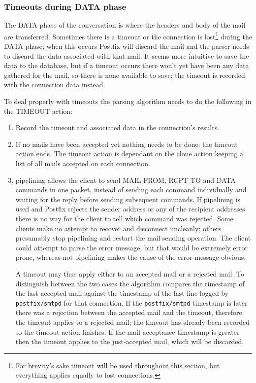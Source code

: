 \documentclass[a4paper,12pt,draft]{article}
\newcommand{\daemon}[1]{%
    \texttt{postfix/#1}%
}
\begin{document}
\subsubsection{Timeouts during DATA phase}

\label{timeouts-during-data-phase}

The DATA phase of the \SMTP{} conversation is where the headers and body of
the mail are transferred.  Sometimes there is a timeout or the connection
is lost\footnote{For brevity's sake timeout will be used throughout this
section, but everything applies equally to lost connections.} during the
DATA phase; when this occurs Postfix will discard the mail and the parser
needs to discard the data associated with that mail.  It seems more
intuitive to save the data to the database, but if a timeout occurs there
won't yet have been any data gathered for the mail, so there is none
available to save; the timeout is recorded with the connection data
instead.

To deal properly with timeouts the parsing algorithm needs to do the
following in the TIMEOUT action:

\begin{enumerate}

    \item Record the timeout and associated data in the connection's
        results.

    \item If no mails have been accepted yet nothing needs to be done; the
        timeout action ends.  The timeout action is dependant on the clone
        action keeping a list of all mails accepted on each connection.

    \item \ESMTP{} pipelining allows the client to send MAIL FROM, RCPT TO
        and DATA commands in one packet, instead of sending each command
        individually and waiting for the reply before sending subsequent
        commands.  If pipelining is used and Postfix rejects the sender
        address or any of the recipient addresses there is no way for the
        client to tell which command was rejected.  Some clients make no
        attempt to recover and disconnect uncleanly; others presumably
        stop pipelining and restart the mail sending operation.  The client
        could attempt to parse the error message, but that would be
        extremely error prone, whereas not pipelining makes the cause of
        the error message obvious.

        A timeout may thus apply either to an accepted mail or a rejected
        mail.  To distinguish between the two cases the algorithm compares
        the timestamp of the last accepted mail against the timestamp of
        the last line logged by \daemon{smtpd} for that connection.  If the
        \daemon{smtpd} timestamp is later there was a rejection between the
        accepted mail and the timeout, therefore the timeout applies to a
        rejected mail; the timeout has already been recorded so the timeout
        action finishes.  If the mail acceptance timestamp is greater then
        the timeout applies to the just-accepted mail, which will be
        discarded.

\end{enumerate}
\end{document}
